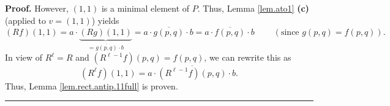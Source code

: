 \documentclass[numbers=enddot,12pt,final,onecolumn,notitlepage]{scrartcl}%
\theoremstyle{definition}
\newenvironment{vershort}{}{}
\newenvironment{proof}[1][Proof]{\noindent\textbf{#1.} }{\ \rule{0.5em}{0.5em}}
\begin{document}
\begin{vershort}
\begin{proof}
However, $\left(  1,1\right)  $ is a minimal element of $P$. Thus, Lemma
\ref{lem.ato1} \textbf{(c)} (applied to $v=\left(  1,1\right)  $) yields
\[
\left(  Rf\right)  \left(  1,1\right)  =a\cdot\underbrace{\left(  Rg\right)
\left(  1,1\right)  }_{=\overline{g\left(  p,q\right)  }\cdot b}%
=a\cdot\overline{g\left(  p,q\right)  }\cdot b=a\cdot\overline{f\left(
p,q\right)  }\cdot b\ \ \ \ \ \ \ \ \ \ \left(  \text{since }g\left(
p,q\right)  =f\left(  p,q\right)  \right)  .
\]
In view of $R^{\ell}=R$ and $\left(  R^{\ell-1}f\right)  \left(  p,q\right)
=f\left(  p,q\right)  $, we can rewrite this as%
\[
\left(  R^{\ell}f\right)  \left(  1,1\right)  =a\cdot\overline{\left(
R^{\ell-1}f\right)  \left(  p,q\right)  }\cdot b.
\]
Thus, Lemma \ref{lem.rect.antip.11full} is proven.
\end{proof}
\end{vershort}
\end{document}
